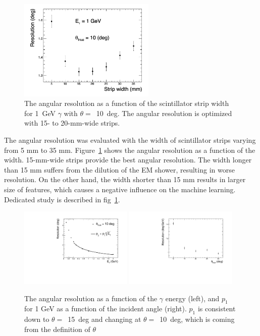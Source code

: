 \documentclass[jkps,preprint,fleqn,showpacs,showkeys]{revtex4}
\begin{document}
\begin{figure}[!hbt]
\includegraphics[width=0.58\textwidth]{figures/res_width.jpg}
\caption{ The angular resolution as a function of the scintillator strip width for 1~GeV $\gamma$ with $\theta=$~10~deg. The angular resolution is optimized with 15- to 20-mm-wide strips.}
\label{fig:angle_reco_width}
\end{figure}

The angular resolution was evaluated with the width of scintillator strips varying from 5 mm to 35 mm. Figure~\ref{fig:angle_reco_width} shows the angular resolution as a function of the width. 15-mm-wide strips provide the best angular resolution. The width longer than 15 mm suffers from the dilution of the EM shower, resulting in worse resolution. On the other hand, the width shorter than 15 mm results in larger size of features, which causes a negative influence on the machine learning. Dedicated study is described in fig~\ref{fig:angle_reco_width}.

\begin{figure}[!hbt]
\includegraphics[width=0.48\textwidth]{figures/Fig5_reco_graph.pdf}
\includegraphics[width=0.48\textwidth]{figures/Fig5_reco_inc.pdf}
\caption{ The angular resolution as a function of the $\gamma$ energy (left), and $p_{1}$ for 1 GeV as a function of the incident angle (right). $p_{1}$ is consistent down to $\theta=$~15~deg and changing at $\theta=$~10~deg, which is coming from the definition of $\theta$ }
\label{fig:angle_reco_dep_gr}
\end{figure}
\end{document}
